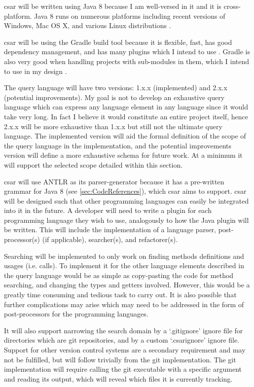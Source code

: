 \documentclass[12pt, letterpaper]{article}
\begin{document}
csar will be written using Java 8 because I am well-versed in it and it is cross-platform.
Java 8 runs on numerous platforms including recent versions of Windows, Mac OS X, and various Linux distributions \autocite{javasysreqs}.

csar will be using the Gradle build tool because it is flexible, fast, has good dependency management, and has many plugins which I intend to use \autocite{gradlevsmaven}.
Gradle is also very good when handling projects with sub-modules in them, which I intend to use in my design \autocite{drdobbswhyusegradle}.

The query language will have two versions: 1.x.x (implemented) and 2.x.x (potential improvements).
My goal is not to develop an exhaustive query language which can express any language element in any language since it would take very long.
In fact I believe it would constitute an entire project itself, hence 2.x.x will be more exhaustive than 1.x.x but still not the ultimate query language.
The implemented version will aid the formal definition of the scope of the query language in the implementation, and the potential improvements version will define a more exhaustive schema for future work.
At a minimum it will support the selected scope detailed within this section.

csar will use ANTLR as its parser-generator because it has a pre-written grammar for Java 8 (see \autoref{sec:CodeReferences}), which csar aims to support.
csar will be designed such that other programming languages can easily be integrated into it in the future.
A developer will need to write a plugin for each programming language they wish to use, analogously to how the Java plugin will be written.
This will include the implementation of a language parser, post-processor(s) (if applicable), searcher(s), and refactorer(s).

Searching will be implemented to only work on finding methods definitions and usages (i.e. calls).
To implement it for the other language elements described in the query language would be as simple as copy-pasting the code for method searching, and changing the types and getters involved.
However, this would be a greatly time consuming and tedious task to carry out.
It is also possible that further complications may arise which may need to be addressed in the form of post-processors for the programming languages.

It will also support narrowing the search domain by a `.gitignore' ignore file for directories which are git repositories, and by a custom `.csarignore' ignore file.
Support for other version control systems are a secondary requirement and may not be fulfilled, but will follow trivially from the git implementation.
The git implementation will require calling the git executable with a specific argument and reading its output, which will reveal which files it is currently tracking.
\end{document}
